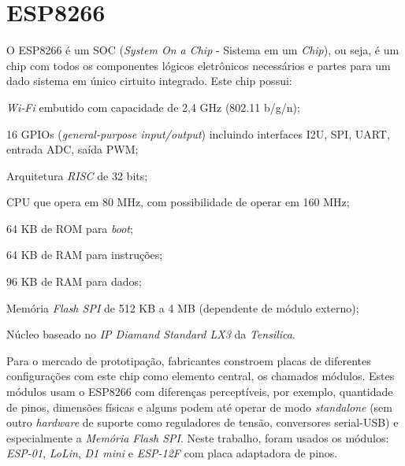 \section{ESP8266}
\label{sec:ESP8266}

O ESP8266 é um SOC (\emph{System On a Chip} - Sistema em um \emph{Chip}),
ou seja, é um chip com todos os componentes lógicos
eletrônicos necessários e partes para um dado sistema em único cirtuito
integrado. Este chip possui:


\begin{alineas}
	\item \emph{Wi-Fi} embutido com capacidade de 2,4 GHz (802.11 b/g/n);

	\item 16 GPIOs (\emph{general-purpose input/output}) incluindo interfaces
 I2U, SPI, UART, entrada ADC, saída PWM;

	\item Arquitetura \emph{RISC} de 32 bits;

	\item CPU que opera em  80 MHz, com possibilidade de operar em 160 MHz;

	\item 64 KB de ROM para \emph{boot};

	\item 64 KB de RAM para instruções;

	\item 96 KB de RAM para dados;

	\item Memória \emph{Flash SPI} de 512 KB a 4 MB (dependente de módulo externo);

	\item Núcleo baseado no \emph{IP Diamand Standard LX3} da \emph{Tensilica}.

\end{alineas}

Para o mercado de prototipação, fabricantes constroem placas de diferentes configurações com
este chip como elemento central, os chamados módulos. Estes módulos usam o
ESP8266 com diferenças perceptíveis, por exemplo, quantidade de pinos, dimensões
físicas e alguns podem até operar de modo \emph{standalone} (sem outro \emph{hardware} de
suporte como reguladores de tensão, conversores serial-USB) e especialmente a
 \emph{Memória Flash SPI}. Neste trabalho, foram usados os módulos:
\emph{ESP-01}, \emph{LoLin}, \emph{D1 mini} e \emph{ESP-12F} com placa adaptadora de pinos.


